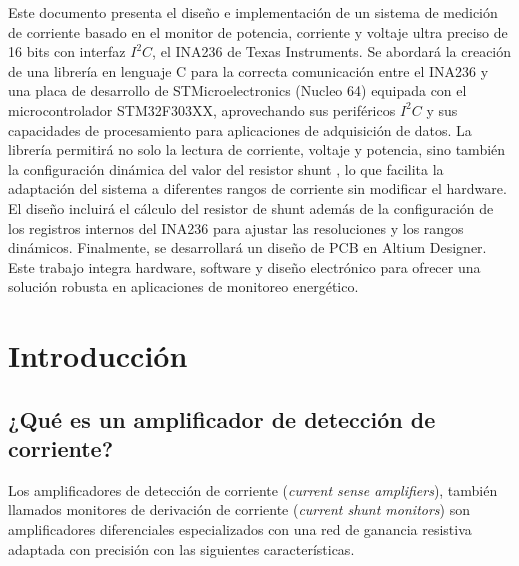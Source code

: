 \documentclass[
10pt, %
a4paper, %
oneside, %
headinclude,footinclude, %
BCOR5mm, %
]{scrartcl}
\begin{document}
Este documento presenta el diseño e implementación de un sistema de medición de corriente basado en el monitor de potencia, corriente y voltaje ultra preciso de 16 bits con interfaz $I^2C$, el INA236 de Texas Instruments. Se abordará la creación de una librería en lenguaje C para la correcta comunicación entre el INA236 y una placa de desarrollo de STMicroelectronics (Nucleo 64) equipada con el microcontrolador STM32F303XX, aprovechando sus periféricos $I^2C$ y sus capacidades de procesamiento para aplicaciones de adquisición de datos. La librería permitirá no solo la lectura de corriente, voltaje y potencia, sino también la configuración dinámica del valor del resistor shunt , lo que facilita la adaptación del sistema a diferentes rangos de corriente sin modificar el hardware. \\
El diseño incluirá el cálculo del resistor de shunt además de la configuración de los registros internos del INA236 para ajustar las resoluciones y los rangos dinámicos. Finalmente, se desarrollará un diseño de PCB en Altium Designer. Este trabajo integra hardware, software y diseño electrónico para ofrecer una solución robusta en aplicaciones de monitoreo energético.


\let\thefootnote\relax{}

\let\thefootnote\relax{}


\newpage %


\section{Introducción}

\subsection{¿Qué es un amplificador de detección de corriente?}
Los amplificadores de detección de corriente (\textit{current sense amplifiers}), también llamados monitores de derivación de corriente (\textit{current shunt monitors}) son amplificadores diferenciales especializados con una red de ganancia resistiva adaptada con precisión con las siguientes características.
\end{document}
